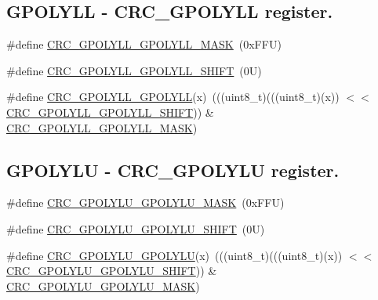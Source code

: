 \subsection*{G\+P\+O\+L\+Y\+LL -\/ C\+R\+C\+\_\+\+G\+P\+O\+L\+Y\+LL register.}
\begin{DoxyCompactItemize}
\item 
\#define \mbox{\hyperlink{group___c_r_c___register___masks_ga659c987f1e9d74e32d16e4b69bd763ee}{C\+R\+C\+\_\+\+G\+P\+O\+L\+Y\+L\+L\+\_\+\+G\+P\+O\+L\+Y\+L\+L\+\_\+\+M\+A\+SK}}~(0x\+F\+F\+U)
\item 
\#define \mbox{\hyperlink{group___c_r_c___register___masks_ga1a323693acd9a37bb90abdc7f16ebbd8}{C\+R\+C\+\_\+\+G\+P\+O\+L\+Y\+L\+L\+\_\+\+G\+P\+O\+L\+Y\+L\+L\+\_\+\+S\+H\+I\+FT}}~(0\+U)
\item 
\#define \mbox{\hyperlink{group___c_r_c___register___masks_gafd454535299300522b0dfe8b5c46b4c4}{C\+R\+C\+\_\+\+G\+P\+O\+L\+Y\+L\+L\+\_\+\+G\+P\+O\+L\+Y\+LL}}(x)~(((uint8\+\_\+t)(((uint8\+\_\+t)(x)) $<$$<$ \mbox{\hyperlink{group___c_r_c___register___masks_ga1a323693acd9a37bb90abdc7f16ebbd8}{C\+R\+C\+\_\+\+G\+P\+O\+L\+Y\+L\+L\+\_\+\+G\+P\+O\+L\+Y\+L\+L\+\_\+\+S\+H\+I\+FT}})) \& \mbox{\hyperlink{group___c_r_c___register___masks_ga659c987f1e9d74e32d16e4b69bd763ee}{C\+R\+C\+\_\+\+G\+P\+O\+L\+Y\+L\+L\+\_\+\+G\+P\+O\+L\+Y\+L\+L\+\_\+\+M\+A\+SK}})
\end{DoxyCompactItemize}
\subsection*{G\+P\+O\+L\+Y\+LU -\/ C\+R\+C\+\_\+\+G\+P\+O\+L\+Y\+LU register.}
\begin{DoxyCompactItemize}
\item 
\#define \mbox{\hyperlink{group___c_r_c___register___masks_gaf2e9b900f7d964512e1541299729abb9}{C\+R\+C\+\_\+\+G\+P\+O\+L\+Y\+L\+U\+\_\+\+G\+P\+O\+L\+Y\+L\+U\+\_\+\+M\+A\+SK}}~(0x\+F\+F\+U)
\item 
\#define \mbox{\hyperlink{group___c_r_c___register___masks_ga4d6303422fb112dfad558ee2f84aa92c}{C\+R\+C\+\_\+\+G\+P\+O\+L\+Y\+L\+U\+\_\+\+G\+P\+O\+L\+Y\+L\+U\+\_\+\+S\+H\+I\+FT}}~(0\+U)
\item 
\#define \mbox{\hyperlink{group___c_r_c___register___masks_ga0e683f5350c138559c8f6c72771610f9}{C\+R\+C\+\_\+\+G\+P\+O\+L\+Y\+L\+U\+\_\+\+G\+P\+O\+L\+Y\+LU}}(x)~(((uint8\+\_\+t)(((uint8\+\_\+t)(x)) $<$$<$ \mbox{\hyperlink{group___c_r_c___register___masks_ga4d6303422fb112dfad558ee2f84aa92c}{C\+R\+C\+\_\+\+G\+P\+O\+L\+Y\+L\+U\+\_\+\+G\+P\+O\+L\+Y\+L\+U\+\_\+\+S\+H\+I\+FT}})) \& \mbox{\hyperlink{group___c_r_c___register___masks_gaf2e9b900f7d964512e1541299729abb9}{C\+R\+C\+\_\+\+G\+P\+O\+L\+Y\+L\+U\+\_\+\+G\+P\+O\+L\+Y\+L\+U\+\_\+\+M\+A\+SK}})
\end{DoxyCompactItemize}
